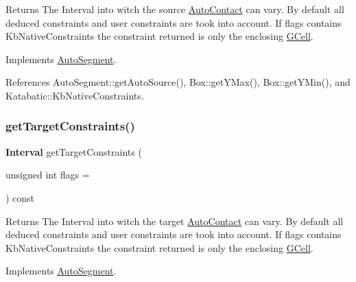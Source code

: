 \begin{DoxyReturn}{Returns}
The Interval into witch the source \mbox{\hyperlink{classKatabatic_1_1AutoContact}{Auto\+Contact}} can vary. By default all deduced constraints and user constraints are took into account. If {\ttfamily flags} contains {\ttfamily Kb\+Native\+Constraints} the constraint returned is only the enclosing \mbox{\hyperlink{classKatabatic_1_1GCell}{G\+Cell}}. 
\end{DoxyReturn}


Implements \mbox{\hyperlink{classKatabatic_1_1AutoSegment_ab7685e309e1d910db3e8237f8a898c35}{Auto\+Segment}}.



References Auto\+Segment\+::get\+Auto\+Source(), Box\+::get\+Y\+Max(), Box\+::get\+Y\+Min(), and Katabatic\+::\+Kb\+Native\+Constraints.

\mbox{\label{classKatabatic_1_1AutoHorizontal_ad2b5aeb2604548378c8d78c60862091f}} 
\subsubsection{\texorpdfstring{get\+Target\+Constraints()}{getTargetConstraints()}}
{\footnotesize\ttfamily \textbf{ Interval} get\+Target\+Constraints (\begin{DoxyParamCaption}\item[{unsigned int}]{flags = {} }\end{DoxyParamCaption}) const\hspace{0.3cm}{\ttfamily [virtual]}}

\begin{DoxyReturn}{Returns}
The Interval into witch the target \mbox{\hyperlink{classKatabatic_1_1AutoContact}{Auto\+Contact}} can vary. By default all deduced constraints and user constraints are took into account. If {\ttfamily flags} contains {\ttfamily Kb\+Native\+Constraints} the constraint returned is only the enclosing \mbox{\hyperlink{classKatabatic_1_1GCell}{G\+Cell}}. 
\end{DoxyReturn}


Implements \mbox{\hyperlink{classKatabatic_1_1AutoSegment_a9c1b8b3cd57fb7b0bf60c7a6148237c2}{Auto\+Segment}}.



